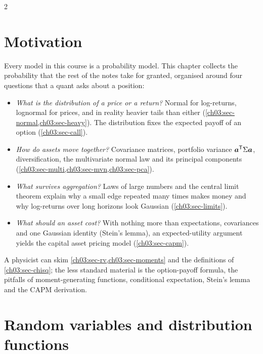 \begin{paracol}{2}
\section*{Motivation}
Every model in this course is a probability model. This chapter collects the probability that the
rest of the notes take for granted, organised around four questions that a quant asks about a
position:
\begin{itemize}
  \item \emph{What is the distribution of a price or a return?} Normal for log-returns, lognormal
        for prices, and in reality heavier tails than either (\cref{ch03:sec-normal,ch03:sec-heavy}).
        The distribution fixes the expected payoff of an option (\cref{ch03:sec-call}).
  \item \emph{How do assets move together?} Covariance matrices, portfolio variance $\bm a^{\mathsf T}\Sigma\bm a$,
        diversification, the multivariate normal law and its principal components
        (\cref{ch03:sec-multi,ch03:sec-mvn,ch03:sec-pca}).
  \item \emph{What survives aggregation?} Laws of large numbers and the central limit theorem explain
        why a small edge repeated many times makes money and why log-returns over long horizons look
        Gaussian (\cref{ch03:sec-limits}).
  \item \emph{What should an asset cost?} With nothing more than expectations, covariances and one
        Gaussian identity (Stein's lemma), an expected-utility argument yields the capital asset
        pricing model (\cref{ch03:sec-capm}).
\end{itemize}
A physicist can skim \cref{ch03:sec-rv,ch03:sec-moments} and the definitions of
\cref{ch03:sec-chisq}; the less standard material is the option-payoff formula, the pitfalls of
moment-generating functions, conditional expectation, Stein's lemma and the CAPM derivation.

\section{Random variables and distribution functions}\label{ch03:sec-rv}


\end{paracol}

